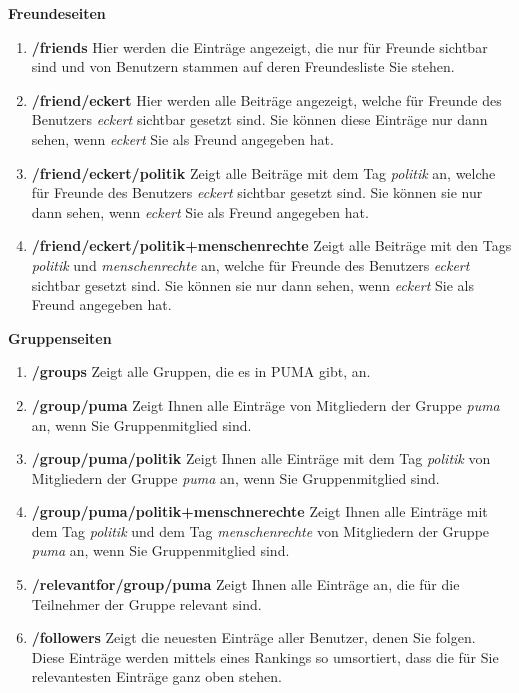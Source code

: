 \documentclass[b5paper,11pt,twoside]{scrbook} %
\begin{document}
\textbf{Freundeseiten} 
\begin{enumerate}
    \item \textbf{/friends} \newline
    Hier werden die Einträge angezeigt, die nur für Freunde sichtbar sind und von Benutzern stammen auf deren Freundesliste Sie stehen.
    \item \textbf{/friend/eckert} \newline
    Hier werden alle Beiträge angezeigt, welche für Freunde des Benutzers \textit{eckert} sichtbar gesetzt sind. Sie können diese Einträge nur dann sehen, wenn \textit{eckert} Sie als Freund angegeben hat.
    \item \textbf{/friend/eckert/politik} \newline
    Zeigt alle Beiträge mit dem Tag \textit{politik} an, welche für Freunde des Benutzers \textit{eckert} sichtbar gesetzt sind. Sie können sie nur dann sehen, wenn \textit{eckert} Sie als Freund angegeben hat.
    \item \textbf{/friend/eckert/politik+menschenrechte} \newline
    Zeigt alle Beiträge mit den Tags \textit{politik} und \textit{menschenrechte} an, welche für Freunde des Benutzers \textit{eckert} sichtbar gesetzt sind. Sie können sie nur dann sehen, wenn \textit{eckert} Sie als Freund angegeben hat.
\end{enumerate}
\textbf{Gruppenseiten}
\begin{enumerate}
    \item \textbf{/groups} \newline
    Zeigt alle Gruppen, die es in PUMA gibt, an.
    \item \textbf{/group/puma} \newline
    Zeigt Ihnen alle Einträge von Mitgliedern der Gruppe \textit{puma} an, wenn Sie Gruppenmitglied sind.
    \item \textbf{/group/puma/politik}\newline
    Zeigt Ihnen alle Einträge mit dem Tag \textit{politik} von Mitgliedern der Gruppe \textit{puma} an, wenn Sie Gruppenmitglied sind.
    \item \textbf{/group/puma/politik+menschnerechte}\newline
    Zeigt Ihnen alle Einträge mit dem Tag \textit{politik} und dem Tag \textit{menschenrechte} von Mitgliedern der Gruppe \textit{puma} an, wenn Sie Gruppenmitglied sind.
    \item \textbf{/relevantfor/group/puma} \newline
    Zeigt Ihnen alle Einträge an,  die für die Teilnehmer der Gruppe relevant sind.
    \item \textbf{/followers} \newline
    Zeigt die neuesten Einträge aller Benutzer, denen Sie folgen. Diese Einträge werden mittels eines Rankings so umsortiert, dass die für Sie relevantesten Einträge ganz oben stehen. %
\end{enumerate}
\end{document}

